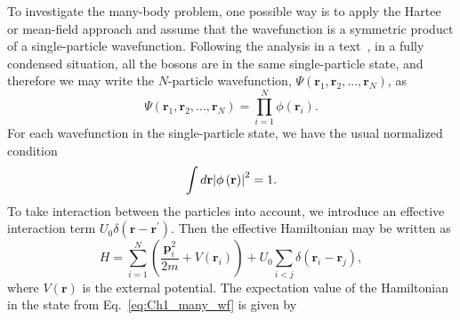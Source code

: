 To investigate the many-body problem, one possible way is to apply the Hartee or mean-field approach and assume that the wavefunction is a symmetric product of a single-particle wavefunction.
Following the analysis in a text~\cite{Pethick:2002tn}, in a fully condensed situation, all the bosons are in the same single-particle state, and therefore we may write the $N$-particle wavefunction, $\Psi\left(\mathbf{r}_1,\mathbf{r}_2,...,\mathbf{r}_N\right)$, as
%
\begin{equation}
    \Psi\left(\mathbf{r}_1,\mathbf{r}_2,...,\mathbf{r}_N\right) = \prod_{i=1}^N \phi\left( \mathbf{r}_i\right).
    \label{eq:Ch1_many_wf}
\end{equation}
%
For each wavefunction in the single-particle state, we have the usual normalized condition
%
\begin{equation}
    \int d\mathbf{r}\abs{\phi\left(\mathbf{r}\right)}^2 = 1.
\end{equation}
%
To take interaction between the particles into account, we introduce an effective interaction term $U_0\delta\left( \mathbf{r}-\mathbf{r}^\prime\right)$.
Then the effective Hamiltonian may be written as
%
\begin{equation}
    H = \sum_{i=1}^N \left(\frac{\mathbf{p}_i^2}{2m} +V\left(\mathbf{r}_i\right) \right) + U_0 \sum_{i<j}\delta\left( \mathbf{r}_i - \mathbf{r}_j \right),
    \label{eq:Ch1_Ham_MP}
\end{equation}
%
where $V\left( \mathbf{r}\right)$ is the external potential.
The expectation value of the Hamiltonian in the state from Eq.~\eqref{eq:Ch1_many_wf} is given by
